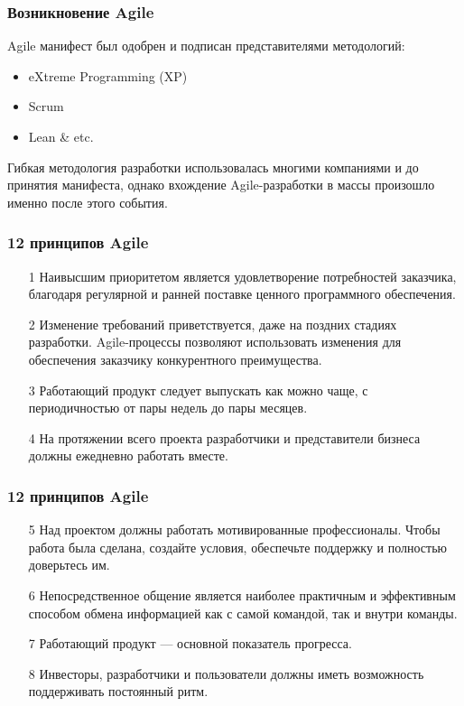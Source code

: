 \documentclass{../industrial-development}
\begin{document}
\begin{frame} \frametitle{Возникновение Agile} 
Agile манифест был одобрен и подписан представителями методологий: 
\begin{itemize}
  \item eXtreme Programming (XP)
	\item Scrum
	\item Lean & etc.
	\end{itemize}
Гибкая методология разработки использовалась многими компаниями и до принятия манифеста, однако вхождение Agile-разработки в массы произошло именно после этого события.
\end{frame}


\begin{frame} \frametitle{12 принципов  Agile}
\begin{enumerate}
\item[1] Наивысшим приоритетом является удовлетворение потребностей 
заказчика, благодаря регулярной и ранней поставке ценного программного 
обеспечения.
\item[2] Изменение требований приветствуется, даже на поздних стадиях разработки. 
Agile-процессы позволяют использовать изменения для обеспечения заказчику
конкурентного преимущества.
\item[3] Работающий продукт следует выпускать как можно чаще, с периодичностью 
от пары недель до пары месяцев.
\item[4] На протяжении всего проекта разработчики и представители бизнеса должны 
ежедневно работать вместе.
\end{enumerate}
\end{frame}


\begin{frame} \frametitle{12 принципов  Agile}
\begin{enumerate}

\item[5] Над проектом должны работать мотивированные профессионалы. Чтобы 
работа была сделана, создайте условия, обеспечьте поддержку и полностью 
доверьтесь им.
\item[6] Непосредственное общение является наиболее практичным и эффективным 
способом обмена информацией как с самой командой, так и внутри команды.
\item[7] Работающий продукт — основной показатель прогресса.
\item[8] Инвесторы, разработчики и пользователи должны иметь возможность 
поддерживать постоянный ритм.
\end{enumerate}
\end{frame}
\end{document}
